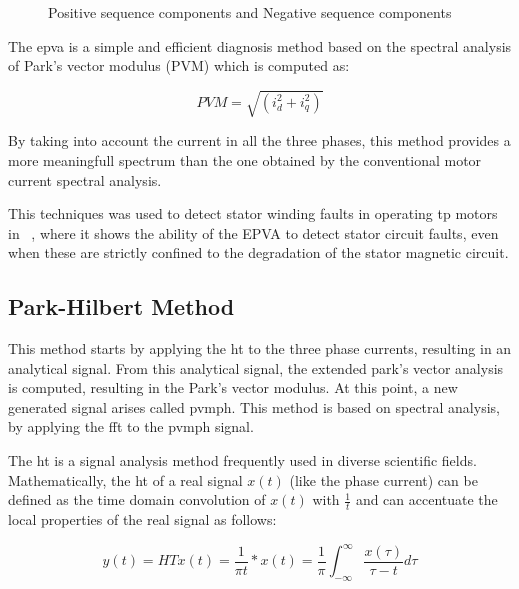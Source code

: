 \begin{figure}[htbp]
\centering
\caption{Positive sequence components and Negative sequence components }
\label{fig:park_vector_circle}
\end{figure}
 
 
 The \acrfull{epva} is a simple and efficient diagnosis method based on the spectral analysis of Park's vector modulus (PVM) which is computed as:
 
\begin{equation} \label{eq:parks_vector_modulus}
    PVM = \sqrt{(i_d^2 + i_q^2)}
\end{equation}

By taking into account the current in all the three phases, this method provides a more meaningfull spectrum than the one obtained by the conventional motor current spectral analysis.
 
This techniques was used to detect stator winding faults in operating \acrshort{tp} motors in  ~\cite{Cruz2001}, where it shows the ability of the EPVA to detect stator circuit faults, even when these are strictly confined to the degradation of the stator magnetic circuit.

\subsection{Park-Hilbert Method} %
\label{subsec:park_hilbert_method}

This method starts by applying the \acrfull{ht} to the three phase currents, resulting in an analytical signal. From this analytical signal, the extended park's vector analysis is computed, resulting in the Park's vector modulus. At this point, a new generated signal arises called \acrfull{pvmph}.
This method is based on spectral analysis, by applying the \acrshort{fft} to the \acrshort{pvmph} signal.

The \acrshort{ht} is a signal analysis method frequently used in diverse scientific fields. Mathematically, the \acrshort{ht} of a real signal $x(t)$ (like the phase current) can be defined as the time domain convolution of $x(t)$ with $\frac{1}{t}$ and can accentuate the local properties of the real signal as follows:

\begin{equation} \label{eq:convolution_signal_ht}
    y(t) = HT{x(t)} = \frac{1}{\pi t} \ast x(t) = \frac{1}{\pi} \int_{- \infty}^{\infty} \frac{x(\tau)}{\tau - t} d \tau 
\end{equation}

